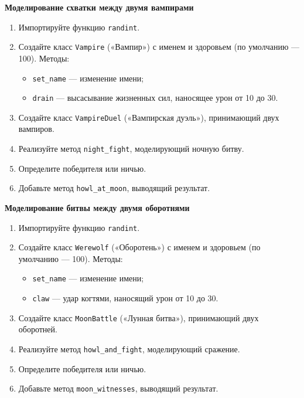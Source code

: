\item \textbf{Моделирование схватки между двумя вампирами}

\begin{enumerate}
    \item Импортируйте функцию \texttt{randint}.

    \item Создайте класс \texttt{Vampire} («Вампир») с именем и здоровьем (по умолчанию — 100).  
    Методы:
    \begin{itemize}
        \item \texttt{set\_name} — изменение имени;
        \item \texttt{drain} — высасывание жизненных сил, наносящее урон от 10 до 30.
    \end{itemize}

    \item Создайте класс \texttt{VampireDuel} («Вампирская дуэль»), принимающий двух вампиров.

    \item Реализуйте метод \texttt{night\_fight}, моделирующий ночную битву.

    \item Определите победителя или ничью.

    \item Добавьте метод \texttt{howl\_at\_moon}, выводящий результат.
\end{enumerate}

\item \textbf{Моделирование битвы между двумя оборотнями}

\begin{enumerate}
    \item Импортируйте функцию \texttt{randint}.

    \item Создайте класс \texttt{Werewolf} («Оборотень») с именем и здоровьем (по умолчанию — 100).  
    Методы:
    \begin{itemize}
        \item \texttt{set\_name} — изменение имени;
        \item \texttt{claw} — удар когтями, наносящий урон от 10 до 30.
    \end{itemize}

    \item Создайте класс \texttt{MoonBattle} («Лунная битва»), принимающий двух оборотней.

    \item Реализуйте метод \texttt{howl\_and\_fight}, моделирующий сражение.

    \item Определите победителя или ничью.

    \item Добавьте метод \texttt{moon\_witnesses}, выводящий результат.
\end{enumerate}

